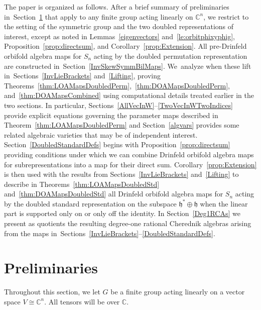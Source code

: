 \documentclass[pdftex]{sigma}
\numberwithin{equation}{section}
\begin{document}
The paper is organized as follows.
After a brief summary of preliminaries in~Section~\ref{Preliminaries}
that apply to any finite group acting linearly on $\mathbb{C}^n$, we restrict
to the setting of the symmetric group and the two doubled representations
of interest, except as noted in Lemmas~\ref{eigenvectors} and~\ref{le:orbitphixyphig}, Proposition~\ref{prop:directsum},
and Corollary~\ref{prop:Extension}.
All pre-Drinfeld orbifold algebra maps for $S_n$ acting by the doubled
permutation representation are constructed in~Section~\ref{InvSkewSymmBilMaps}. We~analyze when these lift in~Sections~\ref{InvLieBrackets} and~\ref{Lifting}, proving Theorems~\ref{thm:LOAMapsDoubledPerm},~\ref{thm:DOAMapsDoubledPerm},
and~\ref{thm:DOAMapsCombined} using computational details treated
earlier in the two sections.
In particular, Sections~\ref{AllVecInW}--\ref{TwoVecInWTwoIndices} provide
explicit equations governing the parameter maps described in
Theorem~\ref{thm:LOAMapsDoubledPerm} and Section~\ref{algvars} provides some related
algebraic varieties that may be of independent interest.
Section~\ref{DoubledStandardDefs} begins with Proposition~\ref{prop:directsum} providing conditions under which we can combine Drinfeld orbifold algebra maps for subrepresentations into a map for their direct sum.
Corollary~\ref{prop:Extension} is then used with the results from
Sections~\ref{InvLieBrackets} and~\ref{Lifting} to describe in Theorems~\ref{thm:LOAMapsDoubledStd}
and~\ref{thm:DOAMapsDoubledStd} all Drinfeld orbifold algebra maps
for $S_n$ acting by the doubled standard representation on the subspace
$\mathfrak{h}^* \oplus \mathfrak{h}$ when the linear part is supported only on or only off
the identity. In Section~\ref{Deg1RCAs} we present as quotients
the resulting degree-one rational Cherednik algebras arising from the maps in~Sections~\ref{InvLieBrackets}--\ref{DoubledStandardDefs}.

\section{Preliminaries}\label{Preliminaries}
Throughout this section, we let $G$ be a finite group acting linearly on a vector space $V\cong\mathbb{C}^n$. All tensors will be over $\mathbb{C}$.
\end{document}
